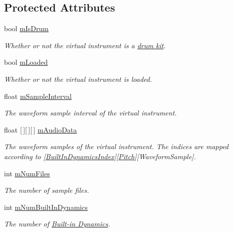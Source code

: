 \subsection*{Protected Attributes}
\begin{DoxyCompactItemize}
\item 
bool \hyperlink{group___v_i_base_pro_var_ga47dbd8aa02ab32b8f802adfd2d3d81de}{m\+Is\+Drum}
\begin{DoxyCompactList}\small\item\em Whether or not the virtual instrument is a \hyperlink{class_drum_kit}{drum kit}. \end{DoxyCompactList}\item 
bool \hyperlink{group___v_i_base_pro_var_ga8978807d1878db5aae91fbd057c46097}{m\+Loaded}
\begin{DoxyCompactList}\small\item\em Whether or not the virtual instrument is loaded. \end{DoxyCompactList}\item 
float \hyperlink{group___v_i_base_pro_var_ga20c1d3d25ea666378d72c833d160ae2e}{m\+Sample\+Interval}
\begin{DoxyCompactList}\small\item\em The waveform sample interval of the virtual instrument. \end{DoxyCompactList}\item 
float \mbox{[}$\,$\mbox{]}\mbox{[}$\,$\mbox{]}\mbox{[}$\,$\mbox{]} \hyperlink{group___v_i_base_pro_var_ga52e76d9b74408660584676035a92a2c6}{m\+Audio\+Data}
\begin{DoxyCompactList}\small\item\em The waveform samples of the virtual instrument. The indices are mapped according to \mbox{[}\hyperlink{group___audio_DefBID}{Built\+In\+Dynamics\+Index}\mbox{]}\mbox{[}\hyperlink{group___music_enums_ga508f69b199ea518f935486c990edac1d}{Pitch}\mbox{]}\mbox{[}Waveform\+Sample\mbox{]}. \end{DoxyCompactList}\item 
int \hyperlink{group___v_i_base_pro_var_ga9a602db8c9833ce75d95dd453c27d341}{m\+Num\+Files}
\begin{DoxyCompactList}\small\item\em The number of sample files. \end{DoxyCompactList}\item 
int \hyperlink{group___v_i_base_pro_var_gac265f64f759d267ee1e1680f8d387011}{m\+Num\+Built\+In\+Dynamics}
\begin{DoxyCompactList}\small\item\em The number of \hyperlink{group___audio_DefBID}{Built-\/in Dynamics}. \end{DoxyCompactList}\item 

\end{DoxyCompactItemize}
